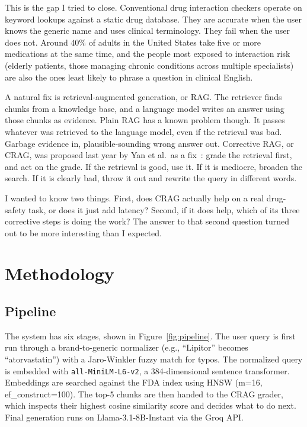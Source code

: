 \documentclass[12pt]{article}
\begin{document}
This is the gap I tried to close. Conventional drug interaction checkers operate on keyword lookups against a static drug database. They are accurate when the user knows the generic name and uses clinical terminology. They fail when the user does not. Around 40\% of adults in the United States take five or more medications at the same time, and the people most exposed to interaction risk (elderly patients, those managing chronic conditions across multiple specialists) are also the ones least likely to phrase a question in clinical English.

A natural fix is retrieval-augmented generation, or RAG. The retriever finds chunks from a knowledge base, and a language model writes an answer using those chunks as evidence. Plain RAG has a known problem though. It passes whatever was retrieved to the language model, even if the retrieval was bad. Garbage evidence in, plausible-sounding wrong answer out. Corrective RAG, or CRAG, was proposed last year by Yan et al.\ as a fix~\cite{yan2024crag}: grade the retrieval first, and act on the grade. If the retrieval is good, use it. If it is mediocre, broaden the search. If it is clearly bad, throw it out and rewrite the query in different words.

I wanted to know two things. First, does CRAG actually help on a real drug-safety task, or does it just add latency? Second, if it does help, which of its three corrective steps is doing the work? The answer to that second question turned out to be more interesting than I expected.

\section{Methodology}

\subsection{Pipeline}

The system has six stages, shown in Figure~\ref{fig:pipeline}. The user query is first run through a brand-to-generic normalizer (e.g., ``Lipitor'' becomes ``atorvastatin'') with a Jaro-Winkler fuzzy match for typos. The normalized query is embedded with \texttt{all-MiniLM-L6-v2}, a 384-dimensional sentence transformer. Embeddings are searched against the FDA index using HNSW (m=16, ef\_construct=100). The top-5 chunks are then handed to the CRAG grader, which inspects their highest cosine similarity score and decides what to do next. Final generation runs on Llama-3.1-8B-Instant via the Groq API.
\end{document}
